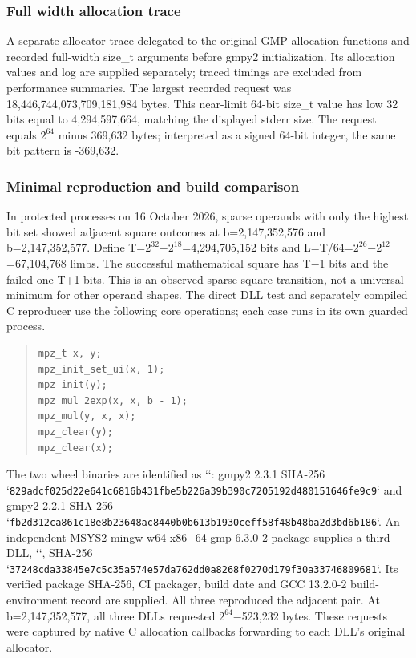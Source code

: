 \documentclass[11pt,a4paper]{article}
\begin{document}
\subsubsection{Full width allocation trace}

A separate allocator trace delegated to the original GMP allocation functions and recorded full-width size\_\allowbreak{}t arguments before gmpy2 initialization. Its allocation values and log are supplied separately; traced timings are excluded from performance summaries. The largest recorded request was 18,446,744,073,709,181,984 bytes. This near-limit 64-bit size\_\allowbreak{}t value has low 32 bits equal to 4,294,597,664, matching the displayed stderr size. The request equals $2^{64}$ minus 369,632 bytes; interpreted as a signed 64-bit integer, the same bit pattern is -369,632.

\subsubsection{Minimal reproduction and build comparison}

In protected processes on 16 October 2026, sparse operands with only the highest bit set showed adjacent square outcomes at b=2,147,352,576 and b=2,147,352,577. Define T=$2^{32}$\ensuremath{-}$2^{18}$=4,294,705,152 bits and L=T/64=$2^{26}$\ensuremath{-}$2^{12}$=67,104,768 limbs. The successful mathematical square has T\ensuremath{-}1 bits and the failed one T+1 bits. This is an observed sparse-square transition, not a universal minimum for other operand shapes. The direct DLL test and separately compiled C reproducer use the following core operations; each case runs in its own guarded process.

\begin{quote}\footnotesize
\begin{verbatim}
mpz_t x, y;
mpz_init_set_ui(x, 1);
mpz_init(y);
mpz_mul_2exp(x, x, b - 1);
mpz_mul(y, x, x);
mpz_clear(y);
mpz_clear(x);
\end{verbatim}
\end{quote}

The two wheel binaries are identified as ``: gmpy2 2.3.1 SHA-256 `\texttt{829adcf025d22e64\allowbreak{}1c6816b431fbe5b2\allowbreak{}26a39b390c720519\allowbreak{}2d480151646fe9c9}` and gmpy2 2.2.1 SHA-256 `\texttt{fb2d312ca861c18e\allowbreak{}8b23648ac8440b0b\allowbreak{}613b1930ceff58f4\allowbreak{}8b48ba2d3bd6b186}`. An independent MSYS2 mingw-w64-x86\_\allowbreak{}64-gmp 6.3.0-2 package \cite{msys2_gmp} supplies a third DLL, ``, SHA-256 `\texttt{37248cda33845e7c\allowbreak{}5c35a574e57da762\allowbreak{}dd0a8268f0270d17\allowbreak{}9f30a33746809681}`. Its verified package SHA-256, CI packager, build date and GCC 13.2.0-2 build-environment record are supplied. All three reproduced the adjacent pair. At b=2,147,352,577, all three DLLs requested $2^{64}$\ensuremath{-}523,232 bytes. These requests were captured by native C allocation callbacks forwarding to each DLL's original allocator.
\end{document}
